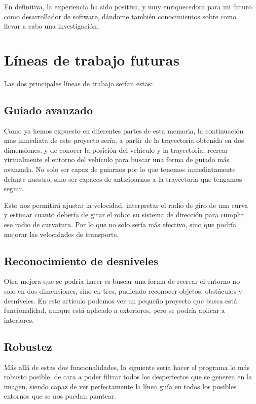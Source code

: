 En definitiva, la experiencia ha sido positiva, y muy enriquecedora para mi futuro como desarrollador de software, dándome también conocimientos sobre como llevar a cabo una investigación.
 
\section{Líneas de trabajo futuras}

Las dos principales líneas de trabajo serían estas:

\subsection{Guiado avanzado}
Como ya hemos expuesto en diferentes partes de esta memoria, la continuación mas inmediata de este proyecto sería, a partir de la trayectoria obtenida en dos dimensiones, y de conocer la posición del vehículo y la trayectoria, recrear virtualmente el entorno del vehículo para buscar una forma de guiado más avanzada. No solo ser capaz de guiarnos por lo que tenemos inmediatamente delante nuestro, sino ser capaces de anticiparnos a la trayectoria que tengamos seguir. 

Esto nos permitirá ajustar la velocidad, interpretar el radio de giro de una curva y estimar cuanto debería de girar el robot su sistema de dirección para cumplir ese radio de curvatura. Por lo que no solo sería más efectivo, sino que podría mejorar las velocidades de transporte.


\subsection{Reconocimiento de desniveles}
Otra mejora que se podría hacer es buscar una forma de recrear el entorno no solo en dos dimensiones, sino en tres, pudiendo reconocer objetos, obstáculos y desniveles. En este articulo\cite{ground_detection} podemos ver un pequeño proyecto que busca está funcionalidad, aunque está aplicado a exteriores, pero se podría aplicar a interiores.


\subsection{Robustez}
Más allá de estas dos funcionalidades, lo siguiente sería hacer el programa lo más robusto posible, de cara a poder filtrar todos los desperfectos que se generen en la imagen, siendo capaz de ver perfectamente la línea guía en todos los posibles entornos que se nos puedan plantear.